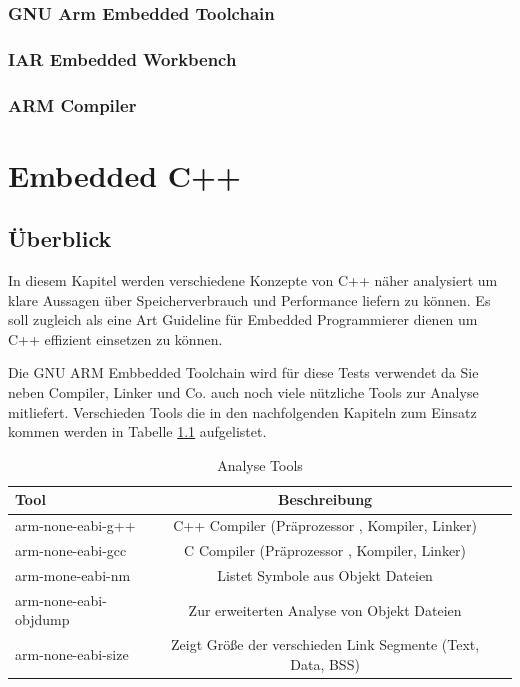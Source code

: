 \documentclass[MES,Master,ngerman]{twbook}%
\begin{document}
\subsection{GNU Arm Embedded Toolchain}
\subsection{IAR Embedded Workbench}
\subsection{ARM Compiler}


\chapter{Embedded C++}
\section{Überblick}
In diesem Kapitel werden verschiedene Konzepte von C++ näher analysiert um klare Aussagen über Speicherverbrauch und Performance liefern zu können. Es soll zugleich als eine Art Guideline für Embedded Programmierer dienen um C++ effizient einsetzen zu können. \newline 

Die GNU ARM Embbedded Toolchain wird für diese Tests verwendet da Sie neben Compiler, Linker und Co. auch noch viele nützliche Tools zur Analyse mitliefert. Verschieden Tools die in den nachfolgenden Kapiteln zum Einsatz kommen werden in Tabelle \ref{tbl:analystools} aufgelistet.

\begin{table}[!htb]
	\centering
	\begin{tabular}{| l | c | r |}
		\hline
		\textbf{Tool}  & \textbf{Beschreibung} \\ \hline
		arm-none-eabi-g++           & C++ Compiler (Präprozessor , Kompiler, Linker) \\ \hline
		arm-none-eabi-gcc       	& C	  Compiler (Präprozessor , Kompiler, Linker) \\ \hline
		arm-mone-eabi-nm        	& Listet Symbole aus Objekt Dateien \\ \hline
		arm-none-eabi-objdump		& Zur erweiterten Analyse von Objekt Dateien \\ \hline
		arm-none-eabi-size			& Zeigt Größe der verschieden Link Segmente (Text, Data, BSS) \\ \hline
	\end{tabular}
	
	\caption{Analyse Tools}
	\label{tbl:analystools}
	
\end{table}
\end{document}

